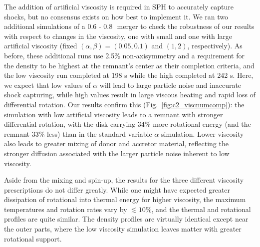 The addition of artificial viscosity is required in SPH to accurately capture shocks, but no consensus exists on how best to implement it.  We ran two additional simulations of a 0.6 - 0.8\,\Msun\ merger to check the robustness of our results with respect to changes in the viscosity, one with small and one with large artificial viscosity (fixed $(\alpha,\beta)=(0.05,0.1)$ and $(1,2)$, respectively).  As before, these additional runs use 2.5\% non-axisymmetry and a requirement for the density to be highest at the remnant's center as their completion criteria, and the low viscosity run completed at 198 s while the high completed at 242 s.  Here, we expect that low values of $\alpha$ will lead to large particle noise and inaccurate shock capturing, while high values result in large viscous heating and rapid loss of differential rotation.  Our results confirm this (Fig.~\ref{fig:c2_viscnumcomp}): the simulation with low artificial viscosity leads to a remnant with stronger differential rotation, with the disk carrying 34\% more rotational energy (and the remnant 33\% less) than in the standard variable $\alpha$ simulation.  Lower viscosity also leads to greater mixing of donor and accretor material, reflecting the stronger diffusion associated with the larger particle noise inherent to low viscosity.

Aside from the mixing and spin-up, the results for the three different viscosity prescriptions do not differ greatly.  While one might have expected greater dissipation of rotational into thermal energy for higher viscosity, the maximum temperatures and rotation rates vary by $\lesssim\!10$\%, and the thermal and rotational profiles are quite similar.  The density profiles are virtually identical except near the outer parts, where the low viscosity simulation leaves matter with greater rotational support.  




